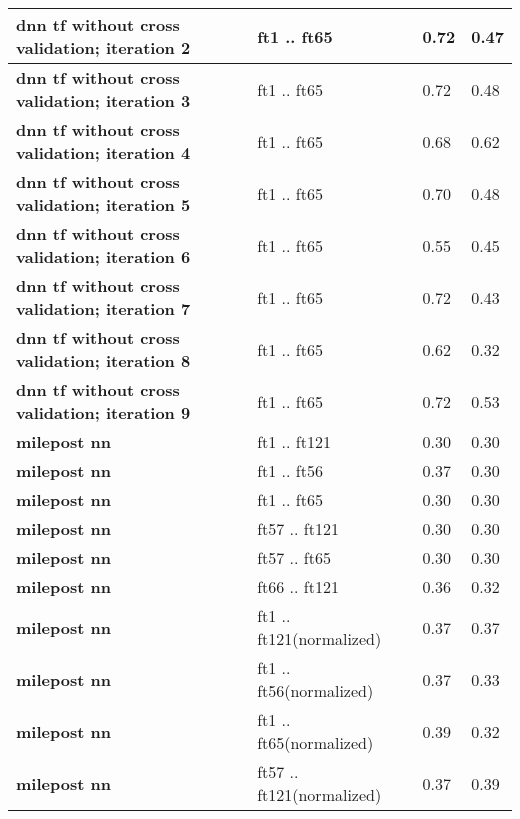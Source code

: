 \begin{tabular}{|l|p{1.2in}|p{0.9in}|p{0.9in}|}
     \hline
      \textbf{ dnn tf without cross validation; iteration 2 } &  ft1 .. ft65  &  0.72  &  0.47 \\
     \hline
      \textbf{ dnn tf without cross validation; iteration 3 } &  ft1 .. ft65  &  0.72  &  0.48 \\
     \hline
      \textbf{ dnn tf without cross validation; iteration 4 } &  ft1 .. ft65  &  0.68  &  0.62 \\
     \hline
      \textbf{ dnn tf without cross validation; iteration 5 } &  ft1 .. ft65  &  0.70  &  0.48 \\
     \hline
      \textbf{ dnn tf without cross validation; iteration 6 } &  ft1 .. ft65  &  0.55  &  0.45 \\
     \hline
      \textbf{ dnn tf without cross validation; iteration 7 } &  ft1 .. ft65  &  0.72  &  0.43 \\
     \hline
      \textbf{ dnn tf without cross validation; iteration 8 } &  ft1 .. ft65  &  0.62  &  0.32 \\
     \hline
      \textbf{ dnn tf without cross validation; iteration 9 } &  ft1 .. ft65  &  0.72  &  0.53 \\
     \hline
      \textbf{ milepost nn } &  ft1 .. ft121  &  0.30  &  0.30 \\
     \hline
      \textbf{ milepost nn } &  ft1 .. ft56  &  0.37  &  0.30 \\
     \hline
      \textbf{ milepost nn } &  ft1 .. ft65  &  0.30  &  0.30 \\
     \hline
      \textbf{ milepost nn } &  ft57 .. ft121  &  0.30  &  0.30 \\
     \hline
      \textbf{ milepost nn } &  ft57 .. ft65  &  0.30  &  0.30 \\
     \hline
      \textbf{ milepost nn } &  ft66 .. ft121  &  0.36  &  0.32 \\
     \hline
      \textbf{ milepost nn } &  ft1 .. ft121\newline(normalized)  &  0.37  &  0.37 \\
     \hline
      \textbf{ milepost nn } &  ft1 .. ft56\newline(normalized)  &  0.37  &  0.33 \\
     \hline
      \textbf{ milepost nn } &  ft1 .. ft65\newline(normalized)  &  0.39  &  0.32 \\
     \hline
      \textbf{ milepost nn } &  ft57 .. ft121\newline(normalized)  &  0.37  &  0.39 \\

\end{tabular}

